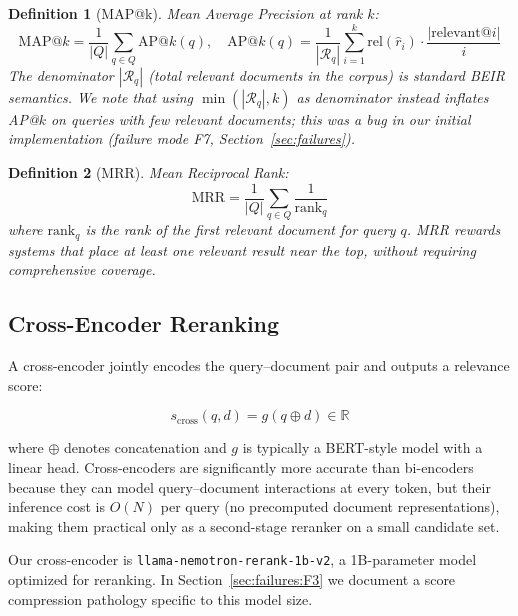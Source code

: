 \documentclass[11pt]{article}
\newtheorem{definition}{Definition}
\begin{document}
\begin{definition}[MAP@k]
Mean Average Precision at rank $k$:
\begin{equation}
  \text{MAP@}k = \frac{1}{|Q|} \sum_{q \in Q} \text{AP@}k(q), \quad
  \text{AP@}k(q) = \frac{1}{|\mathcal{R}_q|} \sum_{i=1}^{k} \text{rel}(\hat{r}_i) \cdot \frac{|\text{relevant@}i|}{i}
\end{equation}
The denominator $|\mathcal{R}_q|$ (total relevant documents in the corpus) is standard
BEIR semantics. We note that using $\min(|\mathcal{R}_q|, k)$ as denominator instead
inflates AP@$k$ on queries with few relevant documents; this was a bug in our initial
implementation (failure mode F7, Section~\ref{sec:failures}).
\end{definition}

\begin{definition}[MRR]
Mean Reciprocal Rank:
\begin{equation}
  \text{MRR} = \frac{1}{|Q|} \sum_{q \in Q} \frac{1}{\text{rank}_q}
\end{equation}
where $\text{rank}_q$ is the rank of the first relevant document for query $q$. MRR
rewards systems that place at least one relevant result near the top, without requiring
comprehensive coverage.
\end{definition}

\subsection{Cross-Encoder Reranking}

A cross-encoder \citep{nogueira2019passage} jointly encodes the query--document pair and
outputs a relevance score:

\begin{equation}
  s_{\text{cross}}(q, d) = g(q \oplus d) \in \mathbb{R}
\end{equation}

where $\oplus$ denotes concatenation and $g$ is typically a BERT-style model with a
linear head. Cross-encoders are significantly more accurate than bi-encoders because
they can model query--document interactions at every token, but their inference cost is
$O(N)$ per query (no precomputed document representations), making them practical only
as a second-stage reranker on a small candidate set.

Our cross-encoder is \texttt{llama-nemotron-rerank-1b-v2}, a 1B-parameter model
optimized for reranking. In Section~\ref{sec:failures:F3} we document a score
compression pathology specific to this model size.
\end{document}
